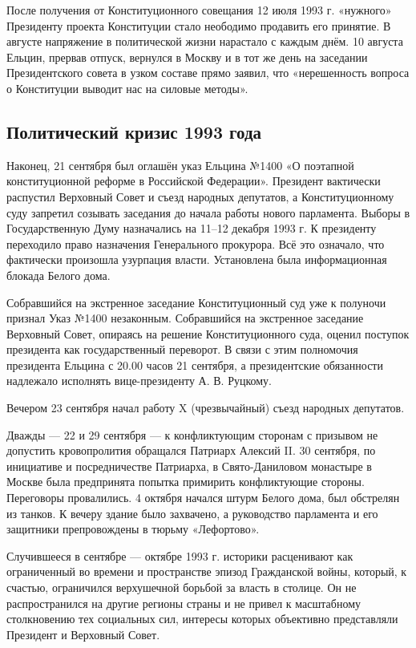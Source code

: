 После получения от Конституционного совещания 12 июля 1993 г. «нужного» Президенту проекта Конституции стало неободимо продавить его принятие. В августе напряжение в политической жизни нарастало с каждым днём. 10 августа Ельцин, прервав отпуск, вернулся в Москву и в тот же день на заседании Президентского совета в узком составе прямо заявил, что «нерешенность вопроса о Конституции выводит нас на силовые методы».

\subsection{Политический кризис 1993 года}
Наконец, 21 сентября был оглашён указ Ельцина №1400 «О поэтапной конституционной реформе в Российской Федерации». Президент вактически распустил Верховный Совет и съезд народных депутатов, а Конституционному суду запретил созывать заседания до начала работы нового парламента. Выборы в Государственную Думу назначались на 11–12 декабря 1993 г. К президенту переходило право назначения Генерального прокурора. Всё это означало, что фактически произошла узурпация власти. Установлена была информационная блокада Белого дома.

Собравшийся на экстренное заседание Конституционный суд уже к полуночи признал Указ №1400 незаконным. Собравшийся на экстренное заседание Верховный Совет, опираясь на решение Конституционного суда, оценил поступок президента как государственный переворот. В связи с этим полномочия президента Ельцина с 20.00 часов 21 сентября, а президентские обязанности надлежало исполнять вице-президенту А. В. Руцкому.

Вечером 23 сентября начал работу X (чрезвычайный) съезд народных депутатов.

Дважды — 22 и 29 сентября — к конфликтующим сторонам с призывом не допустить кровопролития обращался Патриарх Алексий II. 30 сентября, по инициативе и посредничестве Патриарха, в Свято-Даниловом монастыре в Москве была предпринята попытка примирить конфликтующие стороны. Переговоры провалились. 4 октября начался штурм Белого дома, был обстрелян из танков. К вечеру здание было захвачено, а руководство парламента и его защитники препровождены в тюрьму «Лефортово».

Случившееся в сентябре — октябре 1993 г. историки расценивают как ограниченный во времени и пространстве эпизод Гражданской войны, который, к счастью, ограничился верхушечной борьбой за власть в столице. Он не распространился на другие регионы страны и не привел к масштабному столкновению тех социальных сил, интересы которых объективно представляли Президент и Верховный Совет.

